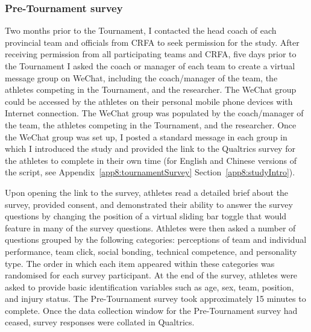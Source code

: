 \begin{CJK}{UTF8}{gbsn}
\subsubsection{Pre-Tournament survey}
Two months prior to the Tournament, I contacted the head coach of each provincial team and officials from CRFA to seek permission for the study.  After receiving permission from all participating teams and CRFA, five days prior to the Tournament I asked the coach or manager of each team to create a virtual message group on WeChat, including the coach/manager of the team, the athletes competing in the Tournament, and the researcher.  The WeChat group could be accessed by the athletes on their personal mobile phone devices with Internet connection. The WeChat group was populated by the coach/manager of the team, the athletes competing in the Tournament, and the researcher. Once the WeChat group was set up, I posted a standard message in each group in which I introduced the study and provided the link to the Qualtrics survey for the athletes to complete in their own time (for English and Chinese versions of the script, see Appendix~\ref{app8:tournamentSurvey} Section~\ref{app8:studyIntro}).

Upon opening the link to the survey, athletes read a detailed brief about the survey, provided consent, and demonstrated their ability to answer the survey questions by changing the position of a virtual sliding bar toggle that would feature in many of the survey questions.  Athletes were then asked a number of questions grouped by the following categories: perceptions of team and individual performance, team click, social bonding, technical competence, and personality type. The order in which each item appeared within these categories was randomised for each survey participant. At the end of the survey, athletes were asked to provide basic identification variables such as age, sex, team, position, and injury status.  The Pre-Tournament survey took approximately 15 minutes to complete.  Once the data collection window for the Pre-Tournament survey had ceased, survey responses were collated in Qualtrics.


\end{CJK}
